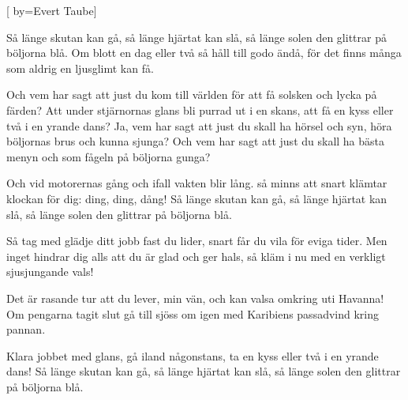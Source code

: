 


[ 	%
	by={Evert Taube}]		%
	
\beginverse*		%
Så länge skutan kan gå,
så länge hjärtat kan slå,
så länge solen den glittrar på böljorna blå.
Om blott en dag eller två
så håll till godo ändå,
för det finns många som aldrig en ljusglimt kan få.
\endverse			%

\beginverse*		%
Och vem har sagt att just du kom till världen
för att få solsken och lycka på färden?
Att under stjärnornas glans
bli purrad ut i en skans,
att få en kyss eller två i en yrande dans?
Ja, vem har sagt att just du skall ha hörsel och syn,
höra böljornas brus och kunna sjunga?
Och vem har sagt att just du skall ha bästa menyn
och som fågeln på böljorna gunga?
\endverse			%

\beginverse*		%
Och vid motorernas gång
och ifall vakten blir lång.
så minns att snart klämtar klockan för dig:
ding, ding, dång!
Så länge skutan kan gå,
så länge hjärtat kan slå,
så länge solen den glittrar på böljorna blå.
\endverse			%

\beginverse*		%
Så tag med glädje ditt jobb fast du lider,
snart får du vila för eviga tider.
Men inget hindrar dig alls
att du är glad och ger hals,
så kläm i nu med en verkligt sjusjungande vals!
\endverse			%

\beginverse*		%
Det är rasande tur att du lever, min vän,
och kan valsa omkring uti Havanna!
Om pengarna tagit slut gå till sjöss om igen 
med Karibiens passadvind kring pannan.
\endverse			%

\beginverse*		%
Klara jobbet med glans,
gå iland någonstans,
ta en kyss eller två i en yrande dans!
Så länge skutan kan gå,
så länge hjärtat kan slå,
så länge solen den glittrar på böljorna blå.
\endverse			%
\endsong			%
